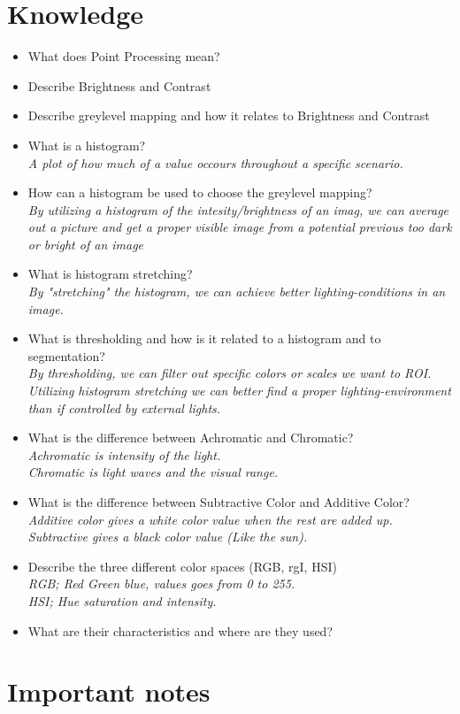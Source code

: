 \documentclass{article}
\begin{document}
\section{Knowledge}
\begin{itemize}
  \item What does Point Processing mean?
   \item Describe Brightness and Contrast
   \item Describe greylevel mapping and how it relates to Brightness and Contrast
   \item What is a histogram?\\
     \textit{A plot of how much of a value occours throughout a specific scenario.}
   \item How can a histogram be used to choose the greylevel mapping?\\
     \textit{By utilizing a histogram of the intesity/brightness of an imag, we can average out a picture and get a proper visible image from a potential previous too dark or bright of an image}
   \item What is histogram stretching?\\
     \textit{By "stretching" the histogram, we can achieve better lighting-conditions in an image.}
   \item What is thresholding and how is it related to a histogram and to segmentation?\\
     \textit{By thresholding, we can filter out specific colors or scales we want to ROI. Utilizing histogram stretching we can better find a proper lighting-environment than if controlled by external lights.}
   \item What is the difference between Achromatic and Chromatic?\\
     \textit{Achromatic is intensity of the light.\\Chromatic is light waves and the visual range.}
   \item What is the difference between Subtractive Color and Additive Color?\\
     \textit{Additive color gives a white color value when the rest are added up.\\Subtractive gives a black color value (Like the sun).}
   \item Describe the three different color spaces (RGB, rgI, HSI)\\
     \textit{RGB; Red Green blue, values goes from 0 to 255.\\HSI; Hue saturation and intensity.}
   \item What are their characteristics and where are they used?
\end{itemize}

\section{Important notes}
\end{document}
